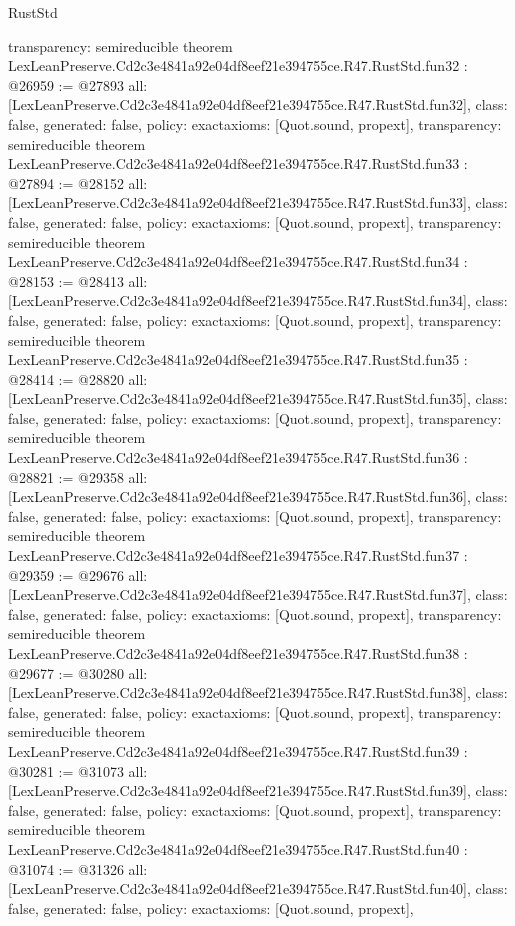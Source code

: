 \begin{lexlean}{RustStd}
\begin{coremodule}
{  transparency: semireducible
}
theorem LexLeanPreserve.Cd2c3e4841a92e04df8eef21e394755ce.R47.RustStd.fun32 : @26959 := @27893 {
  all: [LexLeanPreserve.Cd2c3e4841a92e04df8eef21e394755ce.R47.RustStd.fun32],
  class: false,
  generated: false,
  policy: exact{axioms: [Quot.sound, propext]},
  transparency: semireducible
}
theorem LexLeanPreserve.Cd2c3e4841a92e04df8eef21e394755ce.R47.RustStd.fun33 : @27894 := @28152 {
  all: [LexLeanPreserve.Cd2c3e4841a92e04df8eef21e394755ce.R47.RustStd.fun33],
  class: false,
  generated: false,
  policy: exact{axioms: [Quot.sound, propext]},
  transparency: semireducible
}
theorem LexLeanPreserve.Cd2c3e4841a92e04df8eef21e394755ce.R47.RustStd.fun34 : @28153 := @28413 {
  all: [LexLeanPreserve.Cd2c3e4841a92e04df8eef21e394755ce.R47.RustStd.fun34],
  class: false,
  generated: false,
  policy: exact{axioms: [Quot.sound, propext]},
  transparency: semireducible
}
theorem LexLeanPreserve.Cd2c3e4841a92e04df8eef21e394755ce.R47.RustStd.fun35 : @28414 := @28820 {
  all: [LexLeanPreserve.Cd2c3e4841a92e04df8eef21e394755ce.R47.RustStd.fun35],
  class: false,
  generated: false,
  policy: exact{axioms: [Quot.sound, propext]},
  transparency: semireducible
}
theorem LexLeanPreserve.Cd2c3e4841a92e04df8eef21e394755ce.R47.RustStd.fun36 : @28821 := @29358 {
  all: [LexLeanPreserve.Cd2c3e4841a92e04df8eef21e394755ce.R47.RustStd.fun36],
  class: false,
  generated: false,
  policy: exact{axioms: [Quot.sound, propext]},
  transparency: semireducible
}
theorem LexLeanPreserve.Cd2c3e4841a92e04df8eef21e394755ce.R47.RustStd.fun37 : @29359 := @29676 {
  all: [LexLeanPreserve.Cd2c3e4841a92e04df8eef21e394755ce.R47.RustStd.fun37],
  class: false,
  generated: false,
  policy: exact{axioms: [Quot.sound, propext]},
  transparency: semireducible
}
theorem LexLeanPreserve.Cd2c3e4841a92e04df8eef21e394755ce.R47.RustStd.fun38 : @29677 := @30280 {
  all: [LexLeanPreserve.Cd2c3e4841a92e04df8eef21e394755ce.R47.RustStd.fun38],
  class: false,
  generated: false,
  policy: exact{axioms: [Quot.sound, propext]},
  transparency: semireducible
}
theorem LexLeanPreserve.Cd2c3e4841a92e04df8eef21e394755ce.R47.RustStd.fun39 : @30281 := @31073 {
  all: [LexLeanPreserve.Cd2c3e4841a92e04df8eef21e394755ce.R47.RustStd.fun39],
  class: false,
  generated: false,
  policy: exact{axioms: [Quot.sound, propext]},
  transparency: semireducible
}
theorem LexLeanPreserve.Cd2c3e4841a92e04df8eef21e394755ce.R47.RustStd.fun40 : @31074 := @31326 {
  all: [LexLeanPreserve.Cd2c3e4841a92e04df8eef21e394755ce.R47.RustStd.fun40],
  class: false,
  generated: false,
  policy: exact{axioms: [Quot.sound, propext]},
}
\end{coremodule}
\end{lexlean}
